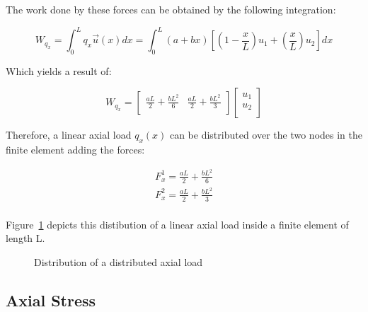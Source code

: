 The work done by these forces can be obtained by the following integration:

\[
  W_{q_x} = \int_{0}^{L} q_x \vec{u}(x) dx = \int_{0}^{L} (a + bx) \left[ \left( 1 - \frac{x}{L} \right) u_1 + \left( \frac{x}{L} \right) u_2 \right] dx
\]

Which yields a result of:

\[
  W_{q_x} =
  \begin{bmatrix}
    \frac{a L}{2} + \frac{b L^2}{6} & \frac{a L}{2} + \frac{b L^2}{3} \\
  \end{bmatrix}
  \begin{bmatrix}
    u_1 \\
    u_2 \\
  \end{bmatrix}
\]

Therefore, a linear axial load $q_x(x)$ can be distributed over the two nodes in the finite element adding the forces:

\begin{equation}
  \begin{split}
    F_x^1 = \frac{a L}{2} + \frac{b L^2}{6} \\
    F_x^2 = \frac{a L}{2} + \frac{b L^2}{3} \\
  \end{split}
\end{equation}

Figure~\ref{fig:axial_finite_element_load_distribution} depicts this distibution of a linear axial load inside a finite element of length L.

\begin{figure}[h]
  \label{fig:axial_finite_element_load_distribution}
  \centering
  \caption{Distribution of a distributed axial load}
\end{figure}


\subsection{Axial Stress}


